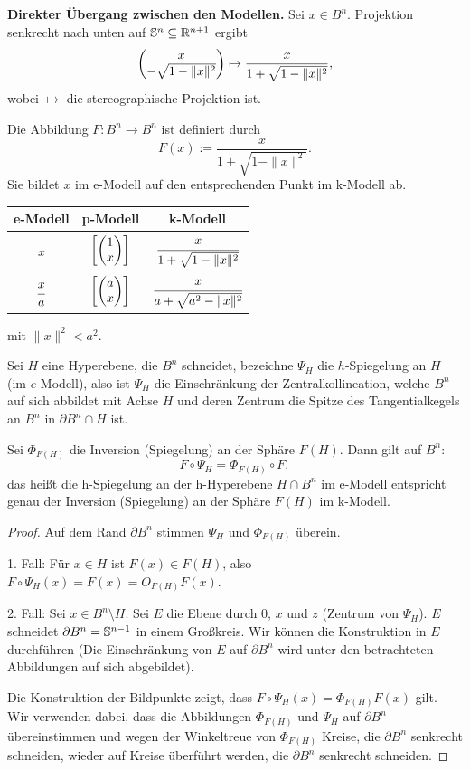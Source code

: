 \textbf{Direkter Übergang zwischen den Modellen.} Sei $x \in B^n$. Projektion
senkrecht nach unten auf $\mathbb{S}^n \subseteq \mathbb{R}^{n+1}$ ergibt
\[ \begin{pmatrix} x \\ - \sqrt{1-\|x\|^2}\end{pmatrix} \mapsto \frac{x}{1 + \sqrt{1-\|x\|^2}}, \]
wobei $\mapsto$ die stereographische Projektion ist.

Die Abbildung $F: B^n \to B^n$ ist definiert durch
\[ F(x) := \frac{x}{1+\sqrt{1-\|x\|^2}}. \]
Sie bildet $x$ im e-Modell auf den entsprechenden Punkt im k-Modell ab.

\begin{center}
\begin{tabular}{c|c|c}
  e-Modell & p-Modell & k-Modell \\
  \hline
  $x$ & $\left[ \begin{pmatrix}1\\x\end{pmatrix} \right]$ & $\cfrac{x}{1+\sqrt{1-\|x\|^2}}$ \\[5pt]
  $\cfrac{x}{a}$ & $\left[ \begin{pmatrix}a\\x\end{pmatrix} \right]$ & $\cfrac{x}{a+\sqrt{a^2-\|x\|^2}}$
\end{tabular}
\end{center}
mit $\|x\|^2 < a^2$.

Sei $H$ eine Hyperebene, die $B^n$ schneidet, bezeichne $\Psi_H$ die
$h$-Spiegelung an $H$ (im $e$-Modell), also ist $\Psi_H$ die Einschränkung der Zentralkollineation, welche $B^n$ auf sich abbildet mit Achse $H$ und deren Zentrum die Spitze des Tangentialkegels an $B^n$ in $\partial B^n \cap H$ ist.

\begin{thm}
 Sei $\Phi_{F(H)}$ die Inversion (Spiegelung) an der Sphäre $F(H)$. Dann gilt auf $B^n$:
 \[ F \circ \Psi_H = \Phi_{F(H)} \circ F, \]
 das heißt die h-Spiegelung an der h-Hyperebene $H \cap B^n$ im e-Modell entspricht genau der Inversion (Spiegelung) an der Sphäre $F(H)$ im k-Modell.
\end{thm}

\begin{proof}
 Auf dem Rand $\partial B^n$ stimmen $\Psi_H$ und $\Phi_{F(H)}$ überein.
 
 1. Fall: Für $x \in H$ ist $F(x) \in F(H)$, also $F \circ \Psi_H(x) = F(x) = O_{F(H)} F(x)$.
 
 2. Fall: Sei $x \in B^n \setminus H$. Sei $E$ die Ebene durch $0$, $x$ und $z$ (Zentrum von $\Psi_H$). $E$ schneidet $\partial B^n = \mathbb{S}^{n-1}$ in einem Großkreis. Wir können die Konstruktion in $E$ durchführen (Die Einschränkung von $E$ auf $\partial B^n$ wird unter den betrachteten Abbildungen auf sich abgebildet). 
 
 Die Konstruktion der Bildpunkte zeigt, dass $F \circ \Psi_H(x) = \Phi_{F(H)} F(x)$ gilt. Wir verwenden dabei, dass die Abbildungen $\Phi_{F(H)}$ und $\Psi_H$ auf $\partial B^n$ übereinstimmen und wegen der Winkeltreue von $\Phi_{F(H)}$ Kreise, die $\partial B^n$ senkrecht schneiden, wieder auf Kreise überführt werden, die $\partial B^n$ senkrecht schneiden.
\end{proof}

